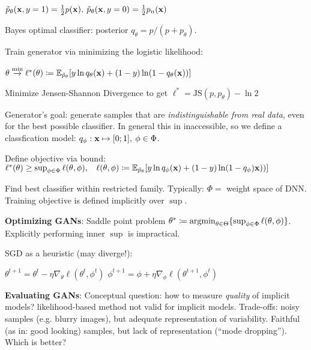 \tab $\Tilde{p}_\theta (\mathbf x,y=1)=\frac{1}{2}p(\mathbf x),\> \Tilde{p}_\theta(\mathbf x,y=0)=\frac{1}{2}p_n(\mathbf x)$

Bayes optimal classifier: posterior $q_\theta=p/(p+p_\theta)$.

Train generator via minimizing the logistic likelihood:

\tab $\theta \overset{\min}{\xrightarrow{}}\ell^*(\theta)\coloneqq\mathbb E_{\Tilde{p}_\theta} \lbrack y \ln q_\theta(\mathbf x) + (1-y)\ln(1-q_\theta(\mathbf x))\rbrack$

Minimize Jensen-Shannon Divergence to get $\ell^*=\text{JS}(p,p_\theta)-\ln 2$

Generator's goal: generate samples that are \emph{indistinguishable from real data}, even for the best possible classifier. In general this in inaccessible, so we define a classfication model:
\tab $q_\phi:\mathbf x\mapsto\lbrack 0;1 \rbrack,\> \phi\in\Phi$.

Define objective via bound: \\
\tab$\ell^*(\theta)\geq \sup_{\phi\in\Phi}\ell(\theta,\phi),\>\>\>\> \ell(\theta,\phi)\coloneqq\mathbb E_{\Tilde{p}_\theta} \lbrack y\ln q_\phi(\mathbf x) + (1-y)\ln(1-q_\phi)\mathbf x))\rbrack$

Find best classifier within restricted family. Typically: $\Phi=$ weight space of DNN. Training objective is defined implicitly over $\sup$.

\textbf{Optimizing GANs}: Saddle point problem
$\theta^*\coloneqq \mathop{\mathrm{argmin}}_{\theta\in\Theta} \{\sup_{\phi\in\Phi} \ell(\theta,\phi)\}$. Explicitly performing inner $\sup$ is impractical. 

SGD as a heuristic (may diverge!):

\tab $\theta^{t+1}=\theta^t-\eta\nabla_\theta\ell(\theta^t,\phi^t)$
\tab $\phi^{t+1}=\phi+\eta\nabla_\phi\ell(\theta^{t+1},\phi^t)$

\textbf{Evaluating GANs}: Conceptual question: how to measure \emph{quality} of implicit models? likelihood-based method not valid for implicit models. Trade-offs: noisy samples (e.g. blurry images), but adequate representation of variability. Faithful (as in: good looking) samples, but lack of representation (``mode dropping''). Which is better?


